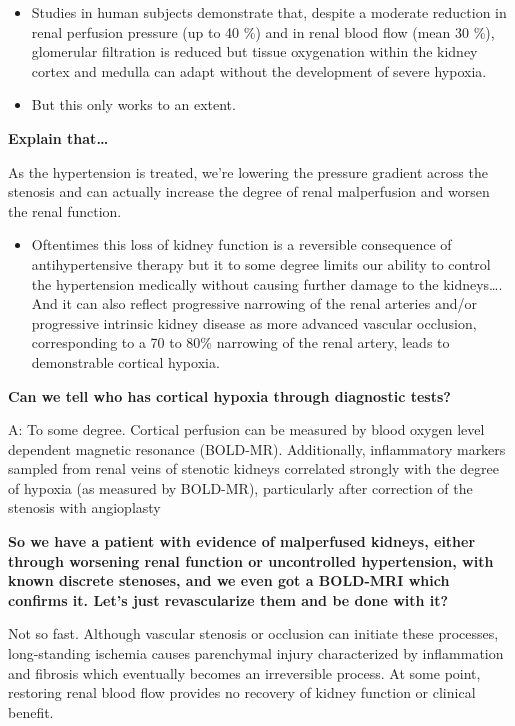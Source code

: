 \documentclass[
]{book}
\providecommand{\tightlist}{%
  \setlength{\itemsep}{0pt}\setlength{\parskip}{0pt}}
\begin{document}
\begin{itemize}
\item
  Studies in human subjects demonstrate that, despite a moderate
  reduction in renal perfusion pressure (up to 40 \%) and in renal
  blood flow (mean 30 \%), glomerular filtration is reduced but tissue
  oxygenation within the kidney cortex and medulla can adapt without
  the development of severe hypoxia.
\item
  But this only works to an extent.
\end{itemize}

\textbf{Explain that\ldots{}}

As the hypertension is treated, we're lowering the pressure gradient
across the stenosis and can actually increase the degree of renal
malperfusion and worsen the renal function.

\begin{itemize}
\tightlist
\item
  Oftentimes this loss of kidney function is a reversible consequence
  of antihypertensive therapy but it to some degree limits our ability
  to control the hypertension medically without causing further damage
  to the kidneys\ldots. And it can also reflect progressive narrowing of
  the renal arteries and/or progressive intrinsic kidney disease as
  more advanced vascular occlusion, corresponding to a 70 to 80\%
  narrowing of the renal artery, leads to demonstrable cortical
  hypoxia.
\end{itemize}

\textbf{Can we tell who has cortical hypoxia through diagnostic tests?}

A: To some degree. Cortical perfusion can be measured by blood oxygen
level dependent magnetic resonance (BOLD-MR). Additionally, inflammatory
markers sampled from renal veins of stenotic kidneys correlated strongly
with the degree of hypoxia (as measured by BOLD-MR), particularly after
correction of the stenosis with angioplasty

\textbf{So we have a patient with evidence of malperfused kidneys, either
through worsening renal function or uncontrolled hypertension, with
known discrete stenoses, and we even got a BOLD-MRI which confirms it.
Let's just revascularize them and be done with it?}

Not so fast. Although vascular stenosis or occlusion can initiate these
processes, long-standing ischemia causes parenchymal injury
characterized by inflammation and fibrosis which eventually becomes an
irreversible process. At some point, restoring renal blood flow provides
no recovery of kidney function or clinical benefit.
\end{document}
